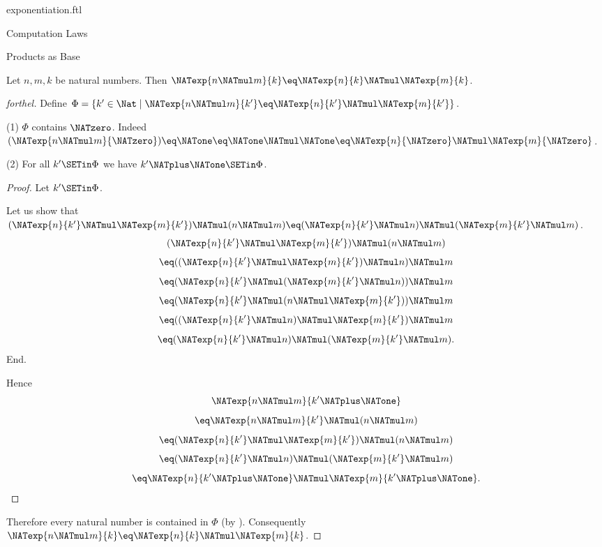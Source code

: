 \documentclass{stex}
\begin{document}
\begin{smodule}{exponentiation.ftl}
\begin{sfragment}{Computation Laws}
  \begin{sfragment}{Products as Base}
    \begin{proposition}[forthel,id=ARITHMETIC_09_2563032276271104]
      Let $n, m, k$ be natural numbers.
      Then $\NATexp{n \NATmul m}{k} \eq \NATexp{n}{k} \NATmul \NATexp{m}{k}$.
    \end{proposition}
    \begin{proof}[forthel]
      Define $\Phi = \{ k' \in \Nat \mid \NATexp{n \NATmul m}{k'} \eq \NATexp{n}{k'} \NATmul \NATexp{m}{k'} \}$.

      (1) $\Phi$ contains $\NATzero$.
      Indeed $(\NATexp{n \NATmul m}{\NATzero})
        \eq \NATone
        \eq \NATone \NATmul \NATone
        \eq \NATexp{n}{\NATzero} \NATmul \NATexp{m}{\NATzero}$. %

      (2) For all $k' \SETin \Phi$ we have $k' \NATplus \NATone \SETin \Phi$.
      \begin{proof}
        Let $k' \SETin \Phi$.

        Let us show that $(\NATexp{n}{k'} \NATmul \NATexp{m}{k'}) \NATmul (n \NATmul m) \eq (\NATexp{n}{k'} \NATmul n) \NATmul (\NATexp{m}{k'} \NATmul m)$.
          \[  (\NATexp{n}{k'} \NATmul \NATexp{m}{k'}) \NATmul (n \NATmul m)       \]
          \[    \eq ((\NATexp{n}{k'} \NATmul \NATexp{m}{k'}) \NATmul n) \NATmul m   \]
          \[    \eq (\NATexp{n}{k'} \NATmul (\NATexp{m}{k'} \NATmul n)) \NATmul m   \]
          \[    \eq (\NATexp{n}{k'} \NATmul (n \NATmul \NATexp{m}{k'})) \NATmul m   \]
          \[    \eq ((\NATexp{n}{k'} \NATmul n) \NATmul \NATexp{m}{k'}) \NATmul m   \]
          \[    \eq (\NATexp{n}{k'} \NATmul n) \NATmul (\NATexp{m}{k'} \NATmul m).  \]
        End.

        Hence
        \[  \NATexp{n \NATmul m}{k' \NATplus \NATone}                          \]
        \[    \eq \NATexp{n \NATmul m}{k'} \NATmul (n \NATmul m)        \]
        \[    \eq (\NATexp{n}{k'} \NATmul \NATexp{m}{k'}) \NATmul (n \NATmul m)   \]
        \[    \eq (\NATexp{n}{k'} \NATmul n) \NATmul (\NATexp{m}{k'} \NATmul m)   \]
        \[    \eq \NATexp{n}{k' \NATplus \NATone} \NATmul \NATexp{m}{k' \NATplus \NATone}.              \]
      \end{proof}

      Therefore every natural number is contained in $\Phi$ (by ).
      Consequently $\NATexp{n \NATmul m}{k} \eq \NATexp{n}{k} \NATmul \NATexp{m}{k}$.
    \end{proof}
  \end{sfragment}


\end{sfragment}
\end{smodule}
\end{document}
